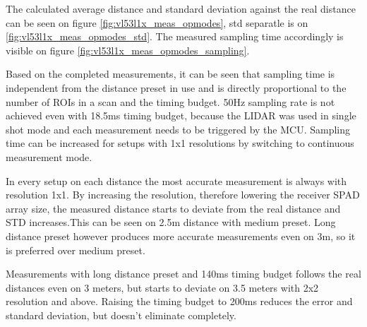 The calculated average distance and standard deviation against the real distance can be seen on 
figure \ref{fig:vl53l1x_meas_opmodes}, std separatle is on \ref{fig:vl53l1x_meas_opmodes_std}. 
The measured sampling time accordingly is visible on figure \ref{fig:vl53l1x_meas_opmodes_sampling}. 

Based on the completed measurements, it can be seen that sampling time is independent from the
distance preset in use and is directly proportional to the number of ROIs in a scan and the 
timing budget. 50Hz sampling rate is not achieved even with 18.5ms timing budget, because 
the LIDAR was used in single shot mode and each measurement needs to be triggered by the MCU.
Sampling time can be increased for setups with 1x1 resolutions by switching to continuous 
measurement mode.

In every setup on each distance the most accurate measurement is always with
resolution 1x1. By increasing the resolution, therefore lowering the receiver SPAD array size,
the measured distance starts to deviate from the real distance and STD increases.This can be
seen on 2.5m distance with medium preset. Long distance preset however produces more accurate 
measurements even on 3m, so it is preferred over medium preset.

Measurements with long distance preset and 140ms timing budget follows the real distances
even on 3 meters, but starts to deviate on 3.5 meters with 2x2 resolution and above. Raising
the timing budget to 200ms reduces the error and standard deviation, but doesn't eliminate 
completely.


